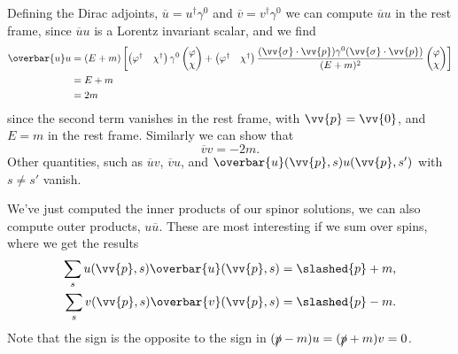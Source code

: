\documentclass[fleqn]{NotesClass}
\newcommand{\hermit}{{\dagger}}
\newcommand{\diracadjoint}[1]{\overbar{#1}}
\begin{document}
    Defining the Dirac adjoints, \(\diracadjoint{u} = u^\hermit \gamma^0\) and \(\diracadjoint{v} = v^\hermit \gamma^0\) we can compute \(\diracadjoint{u}u\) in the rest frame, since \(\diracadjoint{u}u\) is a Lorentz invariant scalar, and we find
    \begin{align}
        \diracadjoint{u}u &= (E + m)\left[
        \begin{pmatrix}
            \varphi^\hermit & \chi^\hermit
        \end{pmatrix}
        \gamma^0
        \begin{pmatrix}
            \varphi\\ \chi
        \end{pmatrix}
        + 
        \begin{pmatrix}
            \varphi^\hermit & \chi^\hermit
        \end{pmatrix}
        \frac{(\vv{\sigma} \cdot \vv{p}) \gamma^0 (\vv{\sigma} \cdot \vv{p})}{(E + m)^2}
        \begin{pmatrix}
            \varphi\\ \chi
        \end{pmatrix}
         \right]\\
        &= E + m\\
        &= 2m
    \end{align}
    since the second term vanishes in the rest frame, with \(\vv{p} = \vv{0}\), and \(E = m\) in the rest frame.
    Similarly we can show that
    \begin{equation}
        \diracadjoint{v}v = -2m.
    \end{equation}
    Other quantities, such as \(\diracadjoint{u}v\), \(\diracadjoint{v}u\), and \(\diracadjoint{u}(\vv{p}, s)u(\vv{p}, s')\) with \(s \ne s'\) vanish.
    
    We've just computed the inner products of our spinor solutions, we can also compute outer products, \(u\diracadjoint{u}\).
    These are most interesting if we sum over spins, where we get the results
    \begin{align}
        \sum_s u(\vv{p}, s) \diracadjoint{u}(\vv{p}, s) &= \slashed{p} + m,\label{eqn:spin sum u}\\
        \sum_s v(\vv{p}, s) \diracadjoint{v}(\vv{p}, s) &= \slashed{p} - m.
    \end{align}
    Note that the sign is the opposite to the sign in \((\slashed{p} - m)u = (\slashed{p} + m)v = 0\).
    
\end{document}
